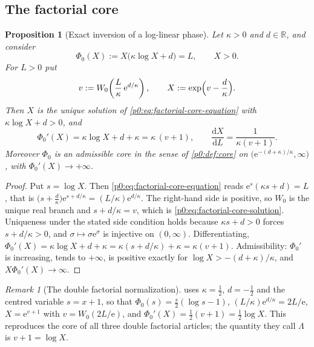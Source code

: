 \documentclass[11pt,a4paper,oneside]{book}
\theoremstyle{plain}
\newtheorem{proposition}[theorem]{Proposition}
\theoremstyle{definition}
\theoremstyle{remark}
\newtheorem{remark}[theorem]{Remark}
\newcommand{\Real}{\mathbb{R}}
\newcommand{\e}{\mathrm{e}}
\newcommand{\dd}{\mathrm{d}}
\newcommand{\Wlam}{W}
\begin{document}
\subsection{The factorial core}

\begin{proposition}[Exact inversion of a log-linear phase]
\label{p0:prop:factorial-core}
Let $\kappa>0$ and $d\in\Real$, and consider
\begin{equation}\label{p0:eq:factorial-core-equation}
 \Phi_0(X):=X\bigl(\kappa\log X+d\bigr)=L,\qquad X>0 .
\end{equation}
For $L>0$ put
\begin{equation}\label{p0:eq:factorial-core-solution}
 v:=\Wlam_0\!\left(\frac L\kappa\,\e^{d/\kappa}\right),
 \qquad
 X:=\exp\Bigl(v-\frac d\kappa\Bigr) .
\end{equation}
Then $X$ is the unique solution of \eqref{p0:eq:factorial-core-equation} with
$\kappa\log X+d>0$, and
\begin{equation}\label{p0:eq:factorial-core-slope}
 \Phi_0'(X)=\kappa\log X+d+\kappa=\kappa\,(v+1),
 \qquad
 \frac{\dd X}{\dd L}=\frac1{\kappa(v+1)} .
\end{equation}
Moreover $\Phi_0$ is an admissible core in the sense of \cref{p0:def:core} on
$\bigl(\e^{-(d+\kappa)/\kappa},\infty\bigr)$, with $\Phi_0'(X)\to+\infty$.
\end{proposition}

\begin{proof}
Put $s=\log X$.  Then \eqref{p0:eq:factorial-core-equation} reads
$\e^{s}(\kappa s+d)=L$, that is
$\bigl(s+\tfrac d\kappa\bigr)\e^{s+d/\kappa}=(L/\kappa)\e^{d/\kappa}$.  The
right-hand side is positive, so $\Wlam_0$ is the unique real branch and
$s+d/\kappa=v$, which is \eqref{p0:eq:factorial-core-solution}.  Uniqueness
under the stated side condition holds because $\kappa s+d>0$ forces
$s+d/\kappa>0$, and $\sigma\mapsto\sigma\e^{\sigma}$ is injective on
$(0,\infty)$.  Differentiating,
$\Phi_0'(X)=\kappa\log X+d+\kappa=\kappa(s+d/\kappa)+\kappa=\kappa(v+1)$.
Admissibility: $\Phi_0'$ is increasing, tends to $+\infty$, is positive exactly
for $\log X>-(d+\kappa)/\kappa$, and $X\Phi_0'(X)\to\infty$.
\end{proof}

\begin{remark}[The double factorial normalization]\label{p0:rem:factorial-core}
 uses $\kappa=\tfrac12$, $d=-\tfrac12$ and the centred
variable $s=x+1$, so that $\Phi_0(s)=\tfrac s2(\log s-1)$,
$(L/\kappa)\e^{d/\kappa}=2L/\e$, $X=\e^{v+1}$ with $v=\Wlam_0(2L/\e)$, and
$\Phi_0'(X)=\tfrac12(v+1)=\tfrac12\log X$.  This reproduces the core of all
three double factorial articles; the quantity they call $\Lambda$ is
$v+1=\log X$.
\end{remark}
\end{document}
